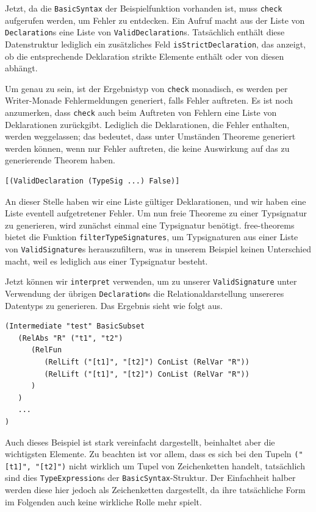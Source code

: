 Jetzt, da die \texttt{BasicSyntax} der Beispielfunktion vorhanden ist, muss \texttt{check} aufgerufen werden, um Fehler
zu entdecken. Ein Aufruf macht aus der Liste von \texttt{Declaration}s eine Liste von \texttt{ValidDeclaration}s. Tatsächlich
enthält diese Datenstruktur lediglich ein zusätzliches Feld \texttt{isStrictDeclaration}, das anzeigt, ob die entsprechende
Deklaration strikte Elemente enthält oder von diesen abhängt.

Um genau zu sein, ist der Ergebnistyp von \texttt{check} monadisch, es werden per Writer-Monade Fehlermeldungen
generiert, falls Fehler auftreten. Es ist noch anzumerken, dass \texttt{check} auch beim Auftreten von Fehlern eine Liste
von Deklarationen zurückgibt. Lediglich die Deklarationen, die Fehler enthalten, werden weggelassen; das bedeutet, dass
unter Umständen Theoreme generiert werden können, wenn nur Fehler auftreten, die keine Auswirkung auf das zu generierende
Theorem haben.

\begin{verbatim}
[(ValidDeclaration (TypeSig ...) False)]
\end{verbatim}

An dieser Stelle haben wir eine Liste gültiger Deklarationen, und wir haben eine Liste eventell aufgetretener Fehler. Um nun
freie Theoreme zu einer Typsignatur zu generieren, wird zunächst einmal eine Typsignatur benötigt. free-theorems bietet die
Funktion \texttt{filterTypeSignatures}, um Typsignaturen aus einer Liste von \texttt{ValidSignature}s herauszufiltern, was in
unserem Beispiel keinen Unterschied macht, weil es lediglich aus einer Typsignatur besteht.

Jetzt können wir \texttt{interpret} verwenden, um zu unserer \texttt{ValidSignature} unter Verwendung der übrigen
\texttt{Declaration}s die Relationaldarstellung unsereres Datentyps zu generieren. Das Ergebnis sieht wie folgt aus.

\begin{verbatim}
(Intermediate "test" BasicSubset
   (RelAbs "R" ("t1", "t2")
      (RelFun
         (RelLift ("[t1]", "[t2]") ConList (RelVar "R"))
         (RelLift ("[t1]", "[t2]") ConList (RelVar "R"))
      )
   )
   ...
)
\end{verbatim}

Auch dieses Beispiel ist stark vereinfacht dargestellt, beinhaltet aber die wichtigsten Elemente. Zu beachten ist vor allem,
dass es sich bei den Tupeln \texttt{("[t1]", "[t2]")} nicht wirklich um Tupel von Zeichenketten handelt, tatsächlich sind dies
\texttt{TypeExpression}s der \texttt{BasicSyntax}-Struktur. Der Einfachheit halber werden diese hier jedoch als Zeichenketten
dargestellt, da ihre tatsächliche Form im Folgenden auch keine wirkliche Rolle mehr spielt.

